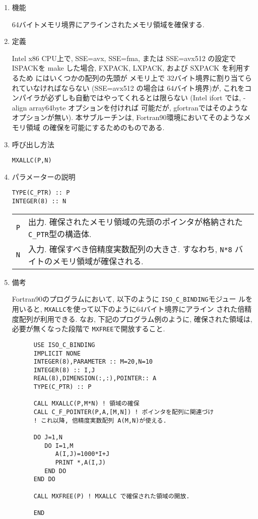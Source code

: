 \documentclass[a4j]{jsarticle}
\begin{document}
\begin{enumerate}

\item 機能 

64バイトメモリ境界にアラインされたメモリ領域を確保する.

\item 定義

Intel x86 CPU上で, SSE=avx,  SSE=fma, または SSE=avx512
の設定で ISPACKを
make した場合, FXPACK, LXPACK, および SXPACK を利用するため
にはいくつかの配列の先頭が
メモリ上で 32バイト境界に割り当てられていなければならない
(SSE=avx512 の場合は 64バイト境界)が,
これをコンパイラが必ずしも自動ではやってくれるとは限らない
(Intel ifort では, -align array64byte オプションを付ければ
可能だが, gfortranではそのようなオプションが無い).
本サブルーチンは, Fortran90環境においてそのようなメモリ領域
の確保を可能にするためのものである.

\item 呼び出し方法 
    
\texttt{MXALLC(P,N)}
  
\item パラメーターの説明

\begin{verbatim}
TYPE(C_PTR) :: P
INTEGER(8) :: N
\end{verbatim}
      
\begin{tabular}{ll}
\texttt{P} & 出力. 確保されたメモリ領域の先頭のポインタが格納された
            \texttt{C\_PTR}型の構造体.\\
\texttt{N} & 入力. 確保すべき倍精度実数配列の大きさ.
      すなわち, \texttt{N*8} バイトのメモリ領域が確保される.
\end{tabular}

\item 備考

Fortran90のプログラムにおいて, 以下のように \texttt{ISO\_C\_BINDING}モジュー
ルを用いると, \texttt{MXALLC}を使って以下のように64バイト境界にアライン
された倍精度配列が利用できる. なお, 下記のプログラム例のように,
確保された領域は, 必要が無くなった段階で \texttt{MXFREE}で開放すること.

\begin{verbatim}
      USE ISO_C_BINDING
      IMPLICIT NONE
      INTEGER(8),PARAMETER :: M=20,N=10
      INTEGER(8) :: I,J
      REAL(8),DIMENSION(:,:),POINTER:: A
      TYPE(C_PTR) :: P

      CALL MXALLC(P,M*N) ! 領域の確保
      CALL C_F_POINTER(P,A,[M,N]) ! ポインタを配列に関連づけ
      ! これ以降, 倍精度実数配列 A(M,N)が使える.

      DO J=1,N
         DO I=1,M
            A(I,J)=1000*I+J
            PRINT *,A(I,J)
         END DO
      END DO

      CALL MXFREE(P) ! MXALLC で確保された領域の開放.
        
      END
\end{verbatim}

\end{enumerate}
\end{document}
